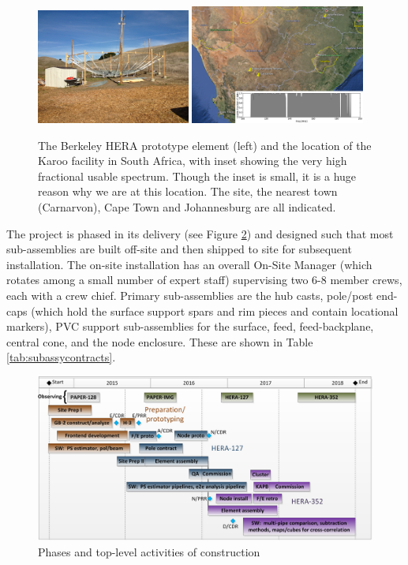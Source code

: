 \documentclass[preprint]{aastex}
\begin{document}
\begin{figure}[htb]
\centering
\includegraphics[width=0.45\textwidth]{plots/heracles.png}
\includegraphics[width=0.51\textwidth]{plots/karoo.png}
\caption{\small The Berkeley HERA prototype element (left) and the location of the Karoo facility in South Africa, with inset showing
the very high fractional usable spectrum.  Though the inset is small, it is a huge reason why we are at this location.  The site, the nearest town (Carnarvon), Cape Town and Johannesburg are all indicated.}
\label{fig:heraclesANDkaroo}
\end{figure}

The project is phased in its delivery (see Figure \ref{fig:scheduleSummary}) and
designed such that most sub-assemblies are built off-site and then shipped to site
for subsequent installation. The on-site installation has an overall On-Site Manager
(which rotates among a small number of expert staff) supervising two 6-8 member
crews, each with a crew chief. Primary sub-assemblies are the hub casts, pole/post
end-caps (which hold the surface support spars and rim pieces and contain locational
markers), PVC support sub-assemblies for the surface, feed, feed-backplane, central
cone, and the node enclosure. These are shown in Table \ref{tab:subassycontracts}.

\begin{figure}[htb]
\centering
\includegraphics[width=\textwidth]{otherdocs/schedule.png}
\caption{\small Phases and top-level activities of construction}
\label{fig:scheduleSummary}
\end{figure}
\end{document}
